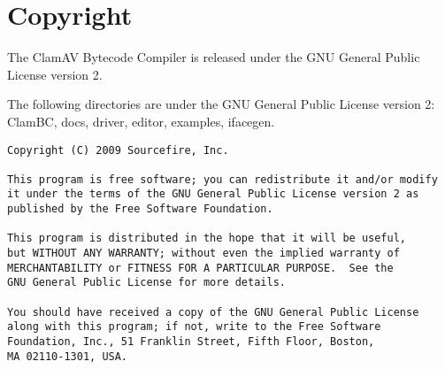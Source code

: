 \chapter{Copyright}

The ClamAV Bytecode Compiler is released under the GNU General Public License
version 2.

The following directories are under the GNU General Public License version 2:
ClamBC, docs, driver, editor, examples, ifacegen.

{\footnotesize
\begin{verbatim}
Copyright (C) 2009 Sourcefire, Inc.

This program is free software; you can redistribute it and/or modify
it under the terms of the GNU General Public License version 2 as
published by the Free Software Foundation.

This program is distributed in the hope that it will be useful,
but WITHOUT ANY WARRANTY; without even the implied warranty of
MERCHANTABILITY or FITNESS FOR A PARTICULAR PURPOSE.  See the
GNU General Public License for more details.

You should have received a copy of the GNU General Public License
along with this program; if not, write to the Free Software
Foundation, Inc., 51 Franklin Street, Fifth Floor, Boston,
MA 02110-1301, USA.
\end{verbatim}
}

